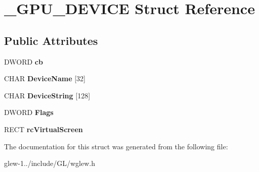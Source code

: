 \hypertarget{struct___g_p_u___d_e_v_i_c_e}{\section{\-\_\-\-G\-P\-U\-\_\-\-D\-E\-V\-I\-C\-E Struct Reference}
\label{struct___g_p_u___d_e_v_i_c_e}
}
\subsection*{Public Attributes}
\begin{DoxyCompactItemize}
\item 
\hypertarget{struct___g_p_u___d_e_v_i_c_e_afcb22f16ba9e526610489ff56ab78ddb}{D\-W\-O\-R\-D {\bfseries cb}}\label{struct___g_p_u___d_e_v_i_c_e_afcb22f16ba9e526610489ff56ab78ddb}

\item 
\hypertarget{struct___g_p_u___d_e_v_i_c_e_a604bfab61f1a2c5d1e635837d369ba14}{C\-H\-A\-R {\bfseries Device\-Name} \mbox{[}32\mbox{]}}\label{struct___g_p_u___d_e_v_i_c_e_a604bfab61f1a2c5d1e635837d369ba14}

\item 
\hypertarget{struct___g_p_u___d_e_v_i_c_e_aff8b7920ccc85afcd6f325da6cdb0b73}{C\-H\-A\-R {\bfseries Device\-String} \mbox{[}128\mbox{]}}\label{struct___g_p_u___d_e_v_i_c_e_aff8b7920ccc85afcd6f325da6cdb0b73}

\item 
\hypertarget{struct___g_p_u___d_e_v_i_c_e_a008db9d0f5fc13a5160805f40465f14a}{D\-W\-O\-R\-D {\bfseries Flags}}\label{struct___g_p_u___d_e_v_i_c_e_a008db9d0f5fc13a5160805f40465f14a}

\item 
\hypertarget{struct___g_p_u___d_e_v_i_c_e_aeb573bbeb3b6c589246720ef259b9a27}{R\-E\-C\-T {\bfseries rc\-Virtual\-Screen}}\label{struct___g_p_u___d_e_v_i_c_e_aeb573bbeb3b6c589246720ef259b9a27}

\end{DoxyCompactItemize}


The documentation for this struct was generated from the following file\-:\begin{DoxyCompactItemize}
\item 
glew-\/1../include/\-G\-L/wglew.\-h\end{DoxyCompactItemize}
